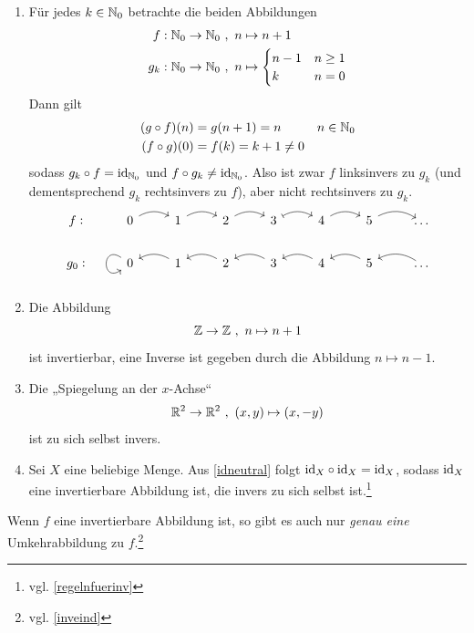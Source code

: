 \begin{bsp} \label{bsp:umkehrabb} \qquad
    \begin{enumerate}
        \item Für jedes $k\in \mathbb N_0$ betrachte die beiden Abbildungen
        \begin{align*}
            f:\mathbb N_0 \to \mathbb N_0 \ &,\ n \mapsto n+1 \\
            g_k: \mathbb N_0 \to \mathbb N_0\ &,\ n \mapsto \begin{cases}
                n-1 & n\ge 1 \\
                k & n=0
            \end{cases}
        \end{align*}
        Dann gilt
        \begin{align*}
            (g\circ f)(n)&=g(n+1)=n && n\in \mathbb N_0 \\
            (f\circ g)(0) & = f(k) = k+1 \neq 0
        \end{align*}
        sodass $g_k\circ f=\mathrm{id}_{\mathbb N_0}$ und $f\circ g_k\neq \mathrm{id}_{\mathbb N_0}$. Also ist zwar $f$ linksinvers zu $g_k$ (und dementsprechend $g_k$ rechtsinvers zu $f$), aber nicht rechtsinvers zu $g_k$.
        \[\begin{tikzcd}
            f\vcentcolon & 0 \ar[r, bend left]& 1 \ar[r, bend left]& 2 \ar[r, bend left]& 3 \ar[r, bend left, mapsto]& 4 \ar[r, bend left]& 5 \ar[r, bend left]& \dots \\
            g_0\vcentcolon & 0 \ar[loop, out=145, in=215, looseness=5] & 1 \ar[l, bend right] & 2 \ar[l, bend right] & 3 \ar[l, bend right] & 4  \ar[l, bend right] & 5  \ar[l, bend right] &  \ar[l, bend right]  \dots
        \end{tikzcd}\]
        \item Die Abbildung
            \[ \mathbb Z\to \mathbb Z \ ,\ n\mapsto n+1 \]
        ist invertierbar, eine Inverse ist gegeben durch die Abbildung $n\mapsto n-1$.
        \item Die „Spiegelung an der $x$-Achse“
        \[ \mathbb R^2 \to \mathbb R^2 \ ,\ (x,y) \mapsto (x,-y) \]
        ist zu sich selbst invers.
        \item Sei $X$ eine beliebige Menge. Aus \cref{idneutral} folgt $\mathrm{id}_X\circ \mathrm{id}_X=\mathrm{id}_X$, sodass $\mathrm{id}_X$ eine invertierbare Abbildung ist, die invers zu sich selbst ist.\footnote{vgl. \cref{regelnfuerinv}}
    \end{enumerate}
\end{bsp}


\begin{satz}\label{umkehreind}
    Wenn $f$ eine invertierbare Abbildung ist, so gibt es auch nur \emph{genau eine} Umkehrabbildung zu $f$.\footnote{vgl. \cref{inveind}}
\end{satz}


